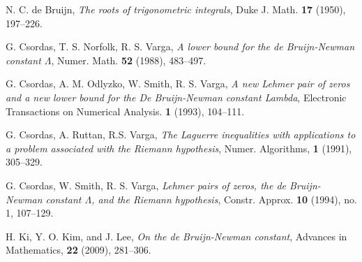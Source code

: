 \documentclass[a4paper,11pt,twoside]{amsart}
\begin{document}
\begin{thebibliography}{99} 

%
%

N. C. de Bruijn, \emph{The roots of trigonometric integrals}, Duke J. Math. \textbf{17} (1950), 197--226.

%

G. Csordas, T. S. Norfolk, R. S. Varga, \emph{A lower bound for the de Bruijn-Newman constant $\Lambda$}, Numer. Math. \textbf{52} (1988), 483--497.

G. Csordas, A. M. Odlyzko, W. Smith, R. S. Varga, \emph{A new Lehmer pair of zeros and a new lower bound for the De Bruijn-Newman constant Lambda}, Electronic Transactions on Numerical Analysis. \textbf{1} (1993), 104--111.

G. Csordas, A. Ruttan, R.S. Varga, \emph{The Laguerre inequalities with applications
to a problem associated with the Riemann hypothesis}, Numer. Algorithms, \textbf{1} (1991), 305--329.

G. Csordas, W. Smith, R. S. Varga, \emph{Lehmer pairs of zeros, the de Bruijn-Newman constant $\Lambda$, and the Riemann hypothesis},  Constr. Approx. \textbf{10} (1994), no. 1, 107--129. 

H. Ki, Y. O. Kim, and J. Lee, \emph{On the de Bruijn-Newman constant}, Advances in Mathematics, \textbf{22} (2009), 281--306.


%


\end{thebibliography}
\end{document}
